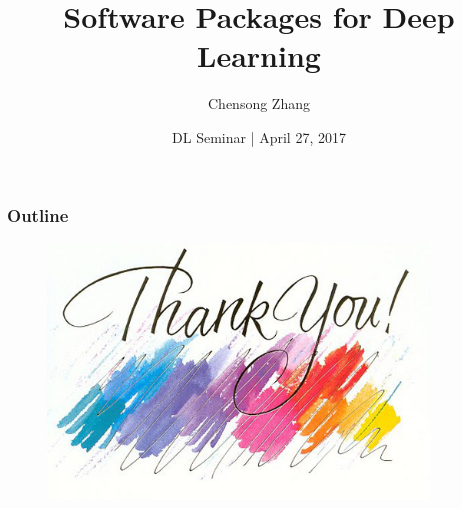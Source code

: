 \documentclass[trans,compress,xcolor=pdftex,dvipsnames,table]{beamer}
\title[DL]
{\LARGE Software Packages for Deep Learning}
\author[Chensong Zhang]{Chensong Zhang}
\institute[LSEC]
{with {\color{RubineRed}Zheng Li} and  {\color{RubineRed}Ronghong Fan}\\[1.5cm]}
\date{\small {\color{OliveGreen}DL Seminar} | {\color{DarkOrchid}April 27, 2017}}
\newif\ifframeinlbf
\newif\ifframeinlbf
\begin{document}

\begin{frame}[plain]
  \titlepage
\end{frame}

\addtocounter{framenumber}{-1} %


\frameinlbffalse


\begin{frame}[plain]
  \frametitle{Outline}
  \setcounter{tocdepth}{1}
  \tableofcontents
\end{frame}
\addtocounter{framenumber}{-1} %

\frameinlbftrue











\begin{frame}[plain]
\addtocounter{framenumber}{-1} %

\begin{figure}[htbp] %
   \centering
   \includegraphics[width=4in]{figures/ThankYou.jpg} 
\end{figure}

\end{frame}

\end{document}
